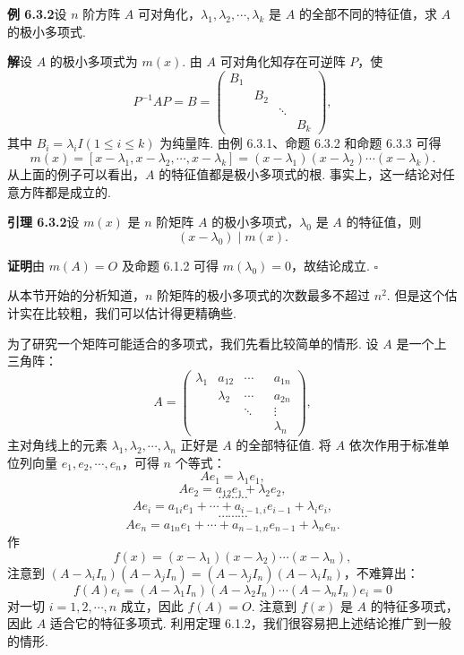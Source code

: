 \documentclass[UTF8,12pt,a4paper,fontset=fandol]{ctexart}
\begin{document}
\noindent\textbf{例 6.3.2}\quad 设 $n$ 阶方阵 $A$ 可对角化，$\lambda_1,\lambda_2,\cdots,\lambda_k$ 是 $A$ 的全部不同的特征值，求 $A$ 的极小多项式.

\noindent\textbf{解}\quad 设 $A$ 的极小多项式为 $m(x)$. 由 $A$ 可对角化知存在可逆阵 $P$，使
\[
P^{-1}AP=B=
\left(\begin{array}{cccc}
B_1 & & & \\
& B_2 & & \\
& & \ddots & \\
& & & B_k
\end{array}\right),
\]
其中 $B_i=\lambda_iI(1\leq i\leq k)$ 为纯量阵. 由例 6.3.1、命题 6.3.2 和命题 6.3.3 可得
\[
m(x)=[x-\lambda_1,x-\lambda_2,\cdots,x-\lambda_k]=(x-\lambda_1)(x-\lambda_2)\cdots(x-\lambda_k).
\]
从上面的例子可以看出，$A$ 的特征值都是极小多项式的根. 事实上，这一结论对任意方阵都是成立的.

\noindent\textbf{引理 6.3.2}\quad 设 $m(x)$ 是 $n$ 阶矩阵 $A$ 的极小多项式，$\lambda_0$ 是 $A$ 的特征值，则
\[
(x-\lambda_0)\mid m(x).
\]

\noindent\textbf{证明}\quad 由 $m(A)=O$ 及命题 6.1.2 可得 $m(\lambda_0)=0$，故结论成立. $\square$

从本节开始的分析知道，$n$ 阶矩阵的极小多项式的次数最多不超过 $n^2$. 但是这个估计实在比较粗，我们可以估计得更精确些.

为了研究一个矩阵可能适合的多项式，我们先看比较简单的情形. 设 $A$ 是一个上三角阵：
\[
A=\left(\begin{array}{ccccc}
\lambda_1 & a_{12} & \cdots & & a_{1n}\\
& \lambda_2 & \cdots & & a_{2n}\\
& & \ddots & & \vdots\\
& & & & \lambda_n
\end{array}\right),
\]
主对角线上的元素 $\lambda_1,\lambda_2,\cdots,\lambda_n$ 正好是 $A$ 的全部特征值. 将 $A$ 依次作用于标准单位列向量 $e_1,e_2,\cdots,e_n$，可得 $n$ 个等式：
\[
Ae_1=\lambda_1e_1,
\]
\[
Ae_2=a_{12}e_1+\lambda_2e_2,
\]
\[
\cdots\cdots\cdots
\]
\[
Ae_i=a_{1i}e_1+\cdots+a_{i-1,i}e_{i-1}+\lambda_ie_i,
\]
\[
\cdots\cdots\cdots
\]
\[
Ae_n=a_{1n}e_1+\cdots+a_{n-1,n}e_{n-1}+\lambda_ne_n.
\]
作
\[
f(x)=(x-\lambda_1)(x-\lambda_2)\cdots(x-\lambda_n),
\]
注意到 $(A-\lambda_iI_n)(A-\lambda_jI_n)=(A-\lambda_jI_n)(A-\lambda_iI_n)$，不难算出：
\[
f(A)e_i=(A-\lambda_1I_n)(A-\lambda_2I_n)\cdots(A-\lambda_nI_n)e_i=0
\]
对一切 $i=1,2,\cdots,n$ 成立，因此 $f(A)=O$. 注意到 $f(x)$ 是 $A$ 的特征多项式，因此 $A$ 适合它的特征多项式. 利用定理 6.1.2，我们很容易把上述结论推广到一般的情形.
\end{document}
